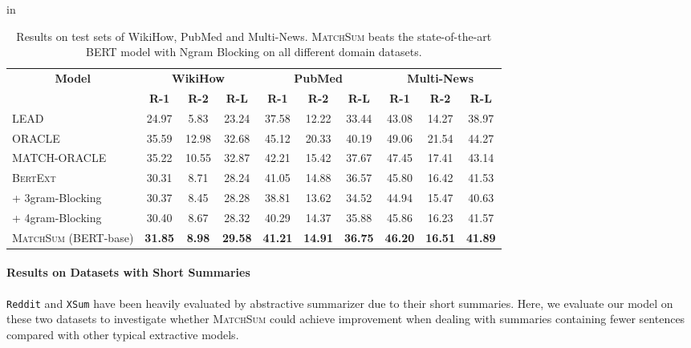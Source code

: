\documentclass[11pt,a4paper]{article}
\begin{document}
\renewcommand\arraystretch{1.1}
\begin{table*}[t]
\center \footnotesize
{} in
\begin{tabular}{lccccccccc}
\toprule
\multicolumn{1}{c}{\multirow{2}[1]{*}{\textbf{Model}}}  &
\multicolumn{3}{c}{\textbf{WikiHow}} &
\multicolumn{3}{c}{\textbf{PubMed}} &
\multicolumn{3}{c}{\textbf{Multi-News}} \\

 & \textbf{R-1} & \textbf{R-2} & \textbf{R-L} &
\textbf{R-1} & \textbf{R-2} & \textbf{R-L} &
\textbf{R-1} & \textbf{R-2} & \textbf{R-L} \\

\cmidrule(lr){1-1} \cmidrule(lr){2-4} \cmidrule(lr){5-7} \cmidrule(lr){8-10}

LEAD & 24.97 & 5.83 & 23.24 & 37.58 & 12.22 & 33.44 & 43.08 & 14.27 & 38.97 \\
ORACLE & 35.59 & 12.98 & 32.68 & 45.12 & 20.33 & 40.19 & 49.06 & 21.54 & 44.27  \\
MATCH-ORACLE & 35.22 & 10.55 & 32.87 & 42.21 & 15.42 & 37.67 & 47.45 & 17.41 & 43.14 \\

\cmidrule(lr){1-1} \cmidrule(lr){2-4} \cmidrule(lr){5-7} \cmidrule(lr){8-10}
\textsc{BertExt} & 30.31 & 8.71	& 28.24 & 41.05 & 14.88	& 36.57 & 45.80 & 16.42 & 41.53 \\
\quad + 3gram-Blocking & 30.37 & 8.45 & 28.28 & 38.81 & 13.62 & 34.52 & 44.94 & 15.47 & 40.63 \\
\quad + 4gram-Blocking & 30.40 & 8.67 & 28.32 & 40.29 & 14.37 & 35.88 & 45.86 & 16.23 & 41.57 \\
\textsc{MatchSum} (BERT-base) & \textbf{31.85} & \textbf{8.98} & \textbf{29.58} & \textbf{41.21} & \textbf{14.91} & \textbf{36.75} & \textbf{46.20} & \textbf{16.51} & \textbf{41.89} \\

\bottomrule
\end{tabular}
\caption{Results on test sets of WikiHow, PubMed and Multi-News. \textsc{MatchSum} beats the state-of-the-art BERT model with Ngram Blocking on all different domain datasets.
}
\label{tab:ngram and match}
\end{table*}



\paragraph{Results on Datasets with Short Summaries}
\texttt{Reddit} and \texttt{XSum} have been heavily evaluated by abstractive summarizer due to their short summaries.
Here, we evaluate our model on these two datasets to investigate whether \textsc{MatchSum} could achieve improvement when dealing with summaries containing fewer sentences compared with other typical extractive models.
\end{document}

